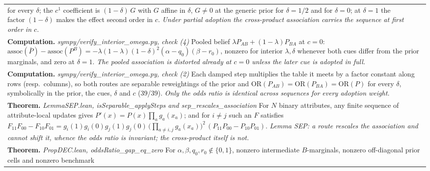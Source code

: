 \documentclass[10pt]{article}
\theoremstyle{definition}
\newlength{\fullw}\setlength{\fullw}{25.9cm}
\begin{document}
{\begin{longtable}{|p{0.9cm}|p{12.2cm}|p{12.2cm}|}
{for every $\delta$; the $c^1$ coefficient is $(1-\delta)\,G$ with $G$ affine in
$\delta$, $G\neq0$ at the generic prior for $\delta=1/2$ and for $\delta=0$; at
$\delta=1$ the factor $(1-\delta)$ makes the effect second order in $c$. \newline \textit{Under partial adoption the cross-product association carries the
sequence at first order in $c$.}} \\
\multicolumn{3}{|p{\fullw}|}{\textbf{Computation.} \textit{sympy/verify\_interior\_omega.py, check (4)} \newline Pooled belief $\lambda P_{AB} + (1-\lambda)P_{BA}$ at $c=0$:
$\mathrm{assoc}(\bar P) - \mathrm{assoc}(P^B)
= -\lambda(1-\lambda)(1-\delta)^2(\alpha-q_0)(\beta-r_0)$, nonzero for interior
$\lambda,\delta$ whenever both cues differ from the prior marginals, and zero
at $\delta=1$. \newline \textit{The pooled association is distorted already at $c=0$ unless the
later cue is adopted in full.}} \\
\multicolumn{3}{|p{\fullw}|}{\textbf{Computation.} \textit{sympy/verify\_interior\_omega.py, check (2)} \newline Each damped step multiplies the table it meets by a factor constant
along rows (resp.\ columns), so both routes are separable reweightings of the
prior and $\mathrm{OR}(P_{AB}) = \mathrm{OR}(P_{BA}) = \mathrm{OR}(P)$
for every $\delta$, symbolically in the prior, the cues, $\delta$ and $c$ (39/39). \newline \textit{Only the odds ratio is identical across sequences for every
adoption weight.}} \\
\multicolumn{3}{|p{\fullw}|}{\textbf{Theorem.} \textit{LemmaSEP.lean, isSeparable\_applySteps and sep\_rescales\_association} \newline For $N$ binary attributes, any finite sequence of attribute-local
updates gives $P'(x) = P(x)\prod_a g_a(x_a)$; and for $i\neq j$ such an $F$
satisfies $F_{11}F_{00} - F_{10}F_{01} = g_i(1)g_i(0)g_j(1)g_j(0)\,
\big(\prod_{a\neq i,j} g_a(x_a)\big)^2\,(P_{11}P_{00} - P_{10}P_{01})$. \newline \textit{Lemma SEP: a route rescales the association and cannot shift it,
whence the odds ratio is invariant; the cross-product itself is not.}} \\
\multicolumn{3}{|p{\fullw}|}{\textbf{Theorem.} \textit{PropDEC.lean, oddsRatio\_gap\_eq\_zero} \newline For $\alpha,\beta,q_0,r_0\notin\{0,1\}$, nonzero intermediate
$B$-marginals, nonzero off-diagonal prior cells and nonzero benchmark
}
\end{longtable}}
\end{document}
